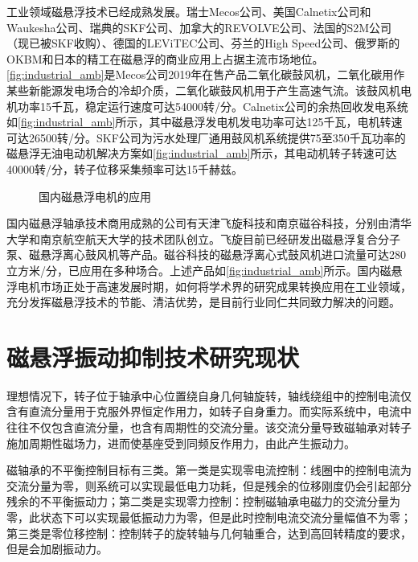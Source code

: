 \documentclass[
  lang=cn,
  degree=master,
  openany,oneside
]{nuaathesis}
\begin{document}
工业领域磁悬浮技术已经成熟发展。瑞士Mecos公司、美国Calnetix公司和Waukesha公司、瑞典的SKF公司、加拿大的REVOLVE公司、法国的S2M公司（现已被SKF收购）、德国的LEViTEC公司、芬兰的High Speed公司、俄罗斯的OKBM和日本的精工在磁悬浮的商业应用上占据主流市场地位。\autoref{fig:industrial_amb}是Mecos公司2019年在售产品二氧化碳鼓风机，二氧化碳用作某些新能源发电场合的冷却介质，二氧化碳鼓风机用于产生高速气流。该鼓风机电机功率15千瓦，稳定运行速度可达54000转/分。Calnetix公司的余热回收发电系统如\autoref{fig:industrial_amb}所示，其中磁悬浮发电机发电功率可达125千瓦，电机转速可达26500转/分。SKF公司为污水处理厂通用鼓风机系统提供75至350千瓦功率的磁悬浮无油电动机解决方案如\autoref{fig:industrial_amb}所示，其电动机转子转速可达40000转/分，转子位移采集频率可达15千赫兹。

\begin{figure}[h!]
  \quad
  \quad
  \caption[国内磁悬浮电机的应用]{国内磁悬浮电机的应用\label{fig:industrial_amb_cn}}
\end{figure}

国内磁悬浮轴承技术商用成熟的公司有天津飞旋科技和南京磁谷科技，分别由清华大学和南京航空航天大学的技术团队创立。飞旋目前已经研发出磁悬浮复合分子泵、磁悬浮离心鼓风机等产品。磁谷科技的磁悬浮离心式鼓风机进口流量可达280立方米/分，已应用在多种场合。上述产品如\autoref{fig:industrial_amb}所示。国内磁悬浮电机市场正处于高速发展时期，如何将学术界的研究成果转换应用在工业领域，充分发挥磁悬浮技术的节能、清洁优势，是目前行业同仁共同致力解决的问题。

\section{磁悬浮振动抑制技术研究现状}
理想情况下，转子位于轴承中心位置绕自身几何轴旋转，轴线绕组中的控制电流仅含有直流分量用于克服外界恒定作用力，如转子自身重力。而实际系统中，电流中往往不仅包含直流分量，也含有周期性的交流分量。该交流分量导致磁轴承对转子施加周期性磁场力，进而使基座受到同频反作用力，由此产生振动力。

磁轴承的不平衡控制目标有三类。第一类是实现零电流控制：线圈中的控制电流为交流分量为零，则系统可以实现最低电力功耗，但是残余的位移刚度仍会引起部分残余的不平衡振动力；第二类是实现零力控制：控制磁轴承电磁力的交流分量为零，此状态下可以实现最低振动力为零，但是此时控制电流交流分量幅值不为零；第三类是零位移控制：控制转子的旋转轴与几何轴重合，达到高回转精度的要求，但是会加剧振动力。
\end{document}
